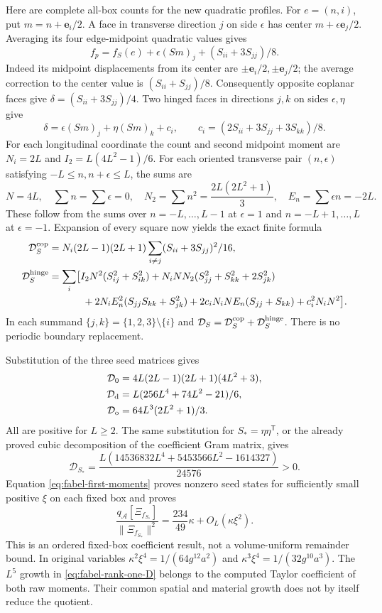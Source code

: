 Here are complete all-box counts for the new quadratic profiles.
For $e=(n,i)$, put $m=n+\mathbf e_i/2$.
A face in transverse direction $j$ on side $\epsilon$ has center
$m+\epsilon\mathbf e_j/2$. Averaging its four edge-midpoint quadratic
values gives
\[
 f_p=f_S(e)+\epsilon(Sm)_j+(S_{ii}+3S_{jj})/8.
\]
Indeed its midpoint displacements from its center are
$\pm\mathbf e_i/2,\pm\mathbf e_j/2$; the average correction to the
center value is $(S_{ii}+S_{jj})/8$.
Consequently opposite coplanar faces give
$\delta=(S_{ii}+3S_{jj})/4$.
Two hinged faces in directions $j,k$ on sides $\epsilon,\eta$ give
\[
 \delta=\epsilon(Sm)_j+\eta(Sm)_k+c_i,\qquad
 c_i=(2S_{ii}+3S_{jj}+3S_{kk})/8 .
\]
For each longitudinal coordinate the count and second midpoint moment
are $N_i=2L$ and $I_2=L(4L^2-1)/6$.
For each oriented transverse pair $(n,\epsilon)$ satisfying
$-L\le n,n+\epsilon\le L$, the sums are
\[
 N=4L,\quad \sum n=\sum\epsilon=0,\quad
 N_2=\sum n^2=\frac{2L(2L^2+1)}3,\quad
 E_n=\sum\epsilon n=-2L .
\]
These follow from the sums over $n=-L,\ldots,L-1$ at $\epsilon=1$
and $n=-L+1,\ldots,L$ at $\epsilon=-1$.
Expansion of every square now yields the exact finite formula
\begin{align*}
 \mathcal D_S^{\rm cop}&=N_i(2L-1)(2L+1)
                  \sum_{i\ne j}(S_{ii}+3S_{jj})^2/16,\\
 \mathcal D_S^{\rm hinge}
 &=\sum_i\bigl[
 I_2N^2(S_{ij}^2+S_{ik}^2)
 +N_iNN_2(S_{jj}^2+S_{kk}^2+2S_{jk}^2)\\
 &\hspace{12mm}+2N_iE_n^2(S_{jj}S_{kk}+S_{jk}^2)
 +2c_iN_iNE_n(S_{jj}+S_{kk})+c_i^2N_iN^2\bigr].
\end{align*}
In each summand $\{j,k\}=\{1,2,3\}\setminus\{i\}$ and
$\mathcal D_S=\mathcal D_S^{\rm cop}+\mathcal D_S^{\rm hinge}$.
There is no periodic boundary replacement.

Substitution of the three seed matrices gives
\begin{align}
 \mathcal D_0&=4L(2L-1)(2L+1)(4L^2+3),\nonumber\\
 \mathcal D_{\rm d}&=L(256L^4+74L^2-21)/6,\nonumber\\
 \mathcal D_{\rm o}&=64L^3(2L^2+1)/3.\label{eq:fabel-three-D}
\end{align}
All are positive for $L\ge2$.
The same substitution for $S_*=\eta\eta^{\mathsf T}$, or the already
proved cubic decomposition of the coefficient Gram matrix, gives
\begin{equation}\label{eq:fabel-rank-one-D}
 \mathcal D_{S_*}
 =\frac{L(14536832L^4+5453566L^2-1614327)}{24576}>0 .
\end{equation}
Equation \eqref{eq:fabel-first-moments} proves nonzero seed states for
sufficiently small positive $\xi$ on each fixed box and proves
\[
 \frac{q_{\mathcal A}[\Xi_{f_{S_*}}]}{\|\Xi_{f_{S_*}}\|^2}
       =\frac{234}{49}\kappa+O_L(\kappa\xi^2).
\]
This is an ordered fixed-box coefficient result, not a volume-uniform
remainder bound. In original variables
$\kappa^2\xi^4=1/(64g^{12}a^2)$ and
$\kappa^3\xi^4=1/(32g^{10}a^3)$.
The $L^5$ growth in \eqref{eq:fabel-rank-one-D} belongs to the computed
Taylor coefficient of both raw moments. Their common spatial and
material growth does not by itself reduce the quotient.

